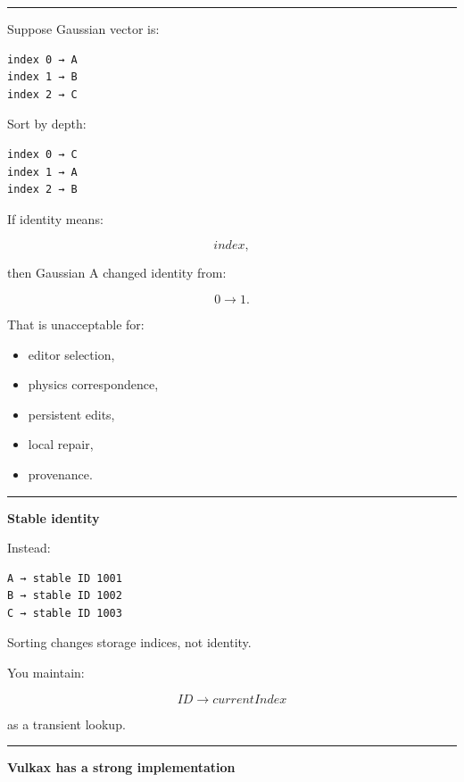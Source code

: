 \begin{center}\rule{0.5\linewidth}{0.5pt}\end{center}

Suppose Gaussian vector is:

\protect{}\label{e6vf6b}%
\begin{verbatim}
index 0 → A
index 1 → B
index 2 → C
\end{verbatim}

Sort by depth:

\protect{}\label{riprkz}%
\begin{verbatim}
index 0 → C
index 1 → A
index 2 → B
\end{verbatim}

If identity means:

\[
index,
\]

then Gaussian A changed identity from:

\[
0\rightarrow1.
\]

That is unacceptable for:

\begin{itemize}
\tightlist
\item
  editor selection,
\item
  physics correspondence,
\item
  persistent edits,
\item
  local repair,
\item
  provenance.
\end{itemize}

\begin{center}\rule{0.5\linewidth}{0.5pt}\end{center}

\textbf{Stable identity}

Instead:

\protect{}\label{juc7yl}%
\begin{verbatim}
A → stable ID 1001
B → stable ID 1002
C → stable ID 1003
\end{verbatim}

Sorting changes storage indices, not identity.

You maintain:

\[
ID\rightarrow currentIndex
\]

as a transient lookup.

\begin{center}\rule{0.5\linewidth}{0.5pt}\end{center}

\textbf{Vulkax has a strong implementation}

